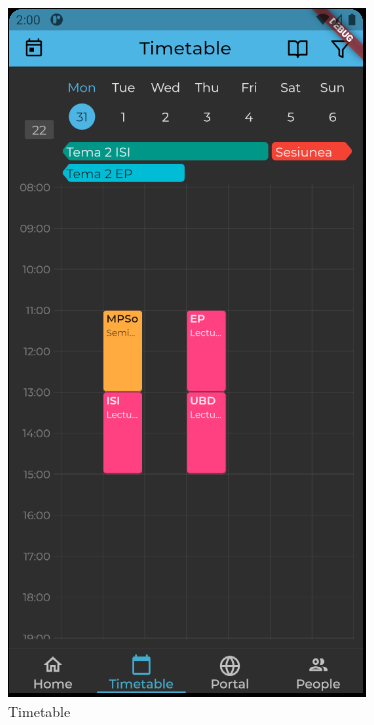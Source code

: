 \begin{figure}[!ht]
\begin{minipage}[b]{0.32\textwidth}
        \includegraphics[width=\textwidth]{figures/ss/image2.png}
        \caption{Timetable}
        \label{5:fig:ftimetable}
    \end{minipage}
    
\end{figure}


